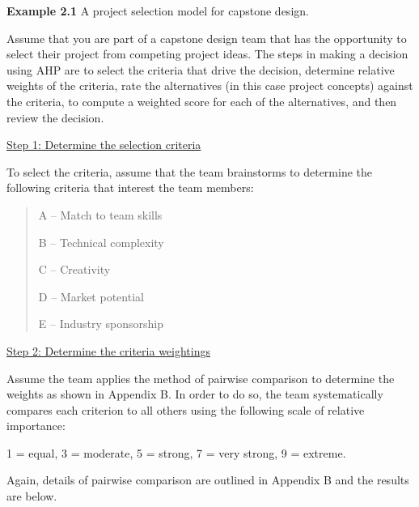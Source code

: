 \textbf{Example 2.1} A project selection model for capstone design.

Assume that you are part of a capstone design team that has the
opportunity to select their project from competing project ideas. The
steps in making a decision using AHP are to select the criteria that
drive the decision, determine relative weights of the criteria, rate the
alternatives (in this case project concepts) against the criteria, to
compute a weighted score for each of the alternatives, and then review
the decision.

\ul{Step 1: Determine the selection criteria}

To select the criteria, assume that the team brainstorms to determine
the following criteria that interest the team members:

\begin{quote}
A -- Match to team skills

B -- Technical complexity

C -- Creativity

D -- Market potential

E -- Industry sponsorship
\end{quote}

\ul{Step 2: Determine the criteria weightings}

Assume the team applies the method of pairwise comparison to determine
the weights as shown in Appendix B. In order to do so, the team
systematically compares each criterion to all others using the following
scale of relative importance:

1 = equal, 3 = moderate, 5 = strong, 7 = very strong, 9 = extreme.

Again, details of pairwise comparison are outlined in Appendix B and the
results are below.

